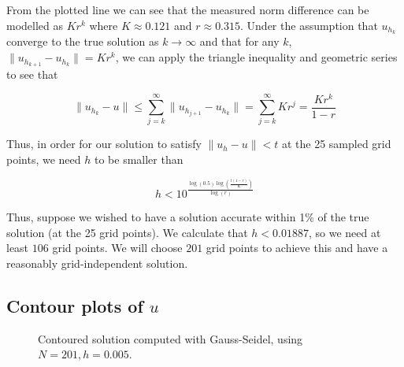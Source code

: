 \documentclass{article}
\numberwithin{equation}{section}
\theoremstyle{definition}
\begin{document}
From the plotted line we can see that the measured norm difference can be modelled as $Kr^k$ where $K \approx 0.121$ and $r \approx 0.315$. Under the assumption that $u_{h_k}$ converge to the true solution as $k \to \infty$ and that for any $k$, $\|u_{h_{k+1}} - u_{h_k}\| = Kr^k$, we can apply the triangle inequality and geometric series to see that

\begin{equation}
    \|u_{h_k} - u\| \leq \sum_{j=k}^{\infty} \|u_{h_{j+1}} - u_{h_{k}}\| = \sum_{j=k}^{\infty} Kr^j = \frac{Kr^k}{1-r}
\end{equation}

Thus, in order for our solution to satisfy $\|u_{h} - u\| < t$ at the 25 sampled grid points, we need $h$ to be smaller than

\begin{equation}
    h<10^{\frac{\log\left(0.5\right)\log\left(\frac{t\left(1-r\right)}{K}\right)}{\log\left(r\right)}}
\end{equation}

Thus, suppose we wished to have a solution accurate within 1\% of the true solution (at the 25 grid points). We calculate that $h < 0.01887$, so we need at least $106$ grid points. We will choose $201$ grid points to achieve this and have a reasonably grid-independent solution.

\subsection{Contour plots of $u$}

\begin{figure}[H]
    \centering
    \hfill
    \caption{Contoured solution computed with Gauss-Seidel, using $N=201, h=0.005$.}
    \label{fig:fig3}
\end{figure}
\end{document}
